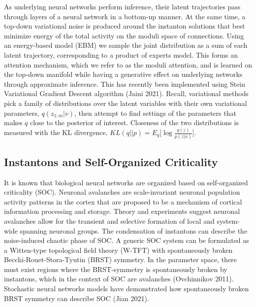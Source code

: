 \documentclass{article}
\begin{document}
    As underlying neural networks perform inference, their latent trajectories pass through layers of a neural network in a bottom-up manner. At the same time, a top-down variational noise is produced around the instanton solutions that best minimize energy of the total activity on the moduli space of connections. Using an energy-based model (EBM) we sample the joint distribution as a sum of each latent trajectory, corresponding to a product of experts model. This forms an attention mechanism, which we refer to as the moduli attention, and is learned on the top-down manifold while having a generative effect on underlying networks through approximate inference. This has recently been implemented using Stein Variational Gradient Descent algorithm (Jaini 2021).
    Recall, variational methods pick a family of distributions over the latent variables with their own variational parameters, $q(z_{1:m} | v)$, then attempt to find settings of the parameters that makes $q$ close to the posterior of interest. Closeness of the two distributions is measured with the KL divergence, $\displaystyle KL(q||p)=  E_q\bigg[ \log \frac{ q(z)}{p(z | x)} \bigg].$
    
    
    

   

\subsection{Instantons and Self-Organized Criticality}
    It is known that biological neural networks are organized based on self-organized criticality (SOC).  Neuronal avalanches are scale-invariant neuronal population activity patterns in the cortex that are proposed to be a mechanism of cortical information processing and storage. Theory and experiments suggest neuronal avalanches allow for the transient and selective formation of local and system-wide spanning neuronal groups. The condensation of instantons can describe the noise-induced chaotic phase of SOC. A generic SOC system can be formulated as a Witten-type topological field theory (W-TFT) with spontaneously broken Becchi-Rouet-Stora-Tyutin (BRST) symmetry. In the parameter space, there must exist regions where the BRST-symmetry is spontaneously broken by instantons, which in the context of SOC are avalanches (Ovchinnikov 2011). Stochastic neural networks models have demonstrated how spontaneously broken BRST symmetry can describe SOC (Jian 2021). 
    
\end{document}
